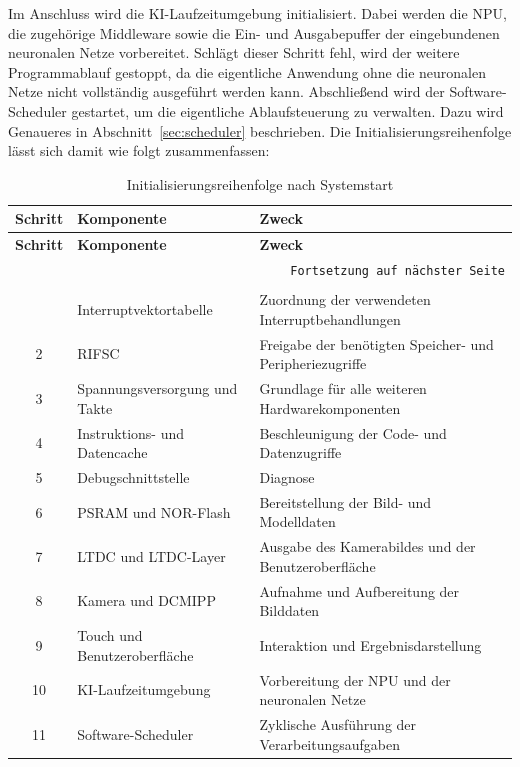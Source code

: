 Im Anschluss wird die KI-Laufzeitumgebung initialisiert. Dabei werden die NPU, die zugehörige Middleware sowie die Ein- und Ausgabepuffer der eingebundenen neuronalen Netze vorbereitet. Schlägt dieser Schritt fehl, wird der weitere Programmablauf gestoppt, da die eigentliche Anwendung ohne die neuronalen Netze nicht vollständig ausgeführt werden kann. Abschließend wird der Software-Scheduler gestartet, um die eigentliche Ablaufsteuerung zu verwalten. Dazu wird Genaueres in Abschnitt~\ref{sec:scheduler} beschrieben. Die Initialisierungsreihenfolge lässt sich damit wie folgt zusammenfassen:

\begin{longtable}{|c|p{}|p{}|}
    \hline
    \textbf{Schritt} & \textbf{Komponente} & \textbf{Zweck} \\
    \hline
    \endfirsthead
    \hline
    \textbf{Schritt} & \textbf{Komponente} & \textbf{Zweck} \\
    \hline
    \endhead
    \hline
    \multicolumn{3}{r}{\texttt{Fortsetzung auf nächster Seite}} \\
    \endfoot
    \caption{Initialisierungsreihenfolge nach Systemstart}
    \label{tab:init-reihenfolge} \\
    \endlastfoot
    1  & Interruptvektortabelle      & Zuordnung der verwendeten Interruptbehandlungen \\
    \hline
    2  & RIFSC                       & Freigabe der benötigten Speicher- und Peripheriezugriffe \\
    \hline
    3  & Spannungsversorgung und Takte & Grundlage für alle weiteren Hardwarekomponenten \\
    \hline
    4  & Instruktions- und Datencache & Beschleunigung der Code- und Datenzugriffe \\
    \hline
    5  & Debugschnittstelle          & Diagnose \\
    \hline
    6  & PSRAM und NOR-Flash         & Bereitstellung der Bild- und Modelldaten \\
    \hline
    7  & LTDC und LTDC-Layer         & Ausgabe des Kamerabildes und der Benutzeroberfläche \\
    \hline
    8  & Kamera und DCMIPP           & Aufnahme und Aufbereitung der Bilddaten \\
    \hline
    9  & Touch und Benutzeroberfläche & Interaktion und Ergebnisdarstellung \\
    \hline
    10 & KI-Laufzeitumgebung         & Vorbereitung der NPU und der neuronalen Netze \\
    \hline
    11 & Software-Scheduler          & Zyklische Ausführung der Verarbeitungsaufgaben \\
    \hline
\end{longtable}

